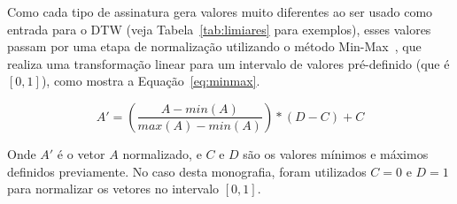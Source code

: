 
Como cada tipo de assinatura gera valores muito diferentes ao ser usado como entrada para o DTW (veja Tabela~\ref{tab:limiares} para exemplos), esses valores passam por uma etapa de normalização utilizando o método Min-Max~\cite{al2006data}, que realiza uma transformação linear para um intervalo de valores pré-definido (que é $[0, 1]$), como mostra a Equação~\ref{eq:minmax}.

\begin{equation}
	\label{eq:minmax}
	A' = \left(\frac{A - min(A)}{max(A) - min(A)}\right) * (D - C) + C	
\end{equation}


Onde $A'$ é o vetor $A$ normalizado, e $C$ e $D$ são os valores mínimos e máximos definidos previamente. No caso desta monografia, foram utilizados $C = 0$ e $D = 1$ para normalizar os vetores no intervalo $[0, 1]$.





